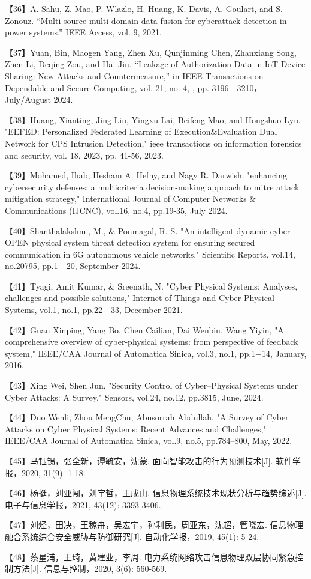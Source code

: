【36】A. Sahu, Z. Mao, P. Wlazlo, H. Huang, K. Davis, A. Goulart, and S. Zonouz. “Multi-source multi-domain data fusion for cyberattack detection in power systems.” IEEE Access, vol. 9, 2021.

【37】Yuan, Bin, Maogen Yang, Zhen Xu, Qunjinming Chen, Zhanxiang Song, Zhen Li, Deqing Zou, and Hai Jin. “Leakage of Authorization-Data in IoT Device Sharing: New Attacks and Countermeasure,” in IEEE Transactions on Dependable and Secure Computing, vol. 21, no. 4, , pp. 3196 - 3210，July/August 2024.

【38】Huang, Xianting, Jing Liu, Yingxu Lai, Beifeng Mao, and Hongshuo Lyu. "EEFED: Personalized Federated Learning of Execution\&Evaluation Dual Network for CPS Intrusion Detection," ieee transactions on information forensics and security, vol. 18, 2023, pp. 41-56, 2023.

【39】Mohamed, Ihab, Hesham A. Hefny, and Nagy R. Darwish. "enhancing cybersecurity defenses: a multicriteria decision-making approach to mitre attack mitigation strategy," International Journal of Computer Networks \& Communications (IJCNC), vol.16, no.4, pp.19-35, July 2024.

【40】Shanthalakshmi, M., \& Ponmagal, R. S. "An intelligent dynamic cyber OPEN physical system threat detection system for ensuring secured communication in 6G autonomous vehicle networks," Scientific Reports, vol.14, no.20795, pp.1 - 20, September 2024.

【41】Tyagi, Amit Kumar, \& Sreenath, N. "Cyber Physical Systems: Analyses, challenges and possible solutions," Internet of Things and Cyber-Physical Systems, vol.1, no.1, pp.22 - 33, December 2021.

【42】Guan Xinping, Yang Bo, Chen Cailian, Dai Wenbin, Wang Yiyin, "A comprehensive overview of cyber-physical systems: from perspective of feedback system," IEEE/CAA Journal of Automatica Sinica, vol.3, no.1, pp.1−14, January, 2016.

【43】Xing Wei, Shen Jun, "Security Control of Cyber–Physical Systems under Cyber Attacks: A Survey," Sensors, vol.24, no.12, pp.3815, June, 2024.

【44】Duo Wenli, Zhou MengChu, Abusorrah Abdullah, "A Survey of Cyber Attacks on Cyber Physical Systems: Recent Advances and Challenges," IEEE/CAA Journal of Automatica Sinica, vol.9, no.5, pp.784–800, May, 2022.

【45】马钰锡，张全新，谭毓安，沈蒙. 面向智能攻击的行为预测技术[J]. 软件学报，2020, 31(9): 1-18.

【46】杨挺，刘亚闯，刘宇哲，王成山. 信息物理系统技术现状分析与趋势综述[J]. 电子与信息学报，2021, 43(12): 3393-3406.

【47】刘烃，田决，王稼舟，吴宏宇，孙利民，周亚东，沈超，管晓宏. 信息物理融合系统综合安全威胁与防御研究[J]. 自动化学报，2019, 45(1): 5-24.

【48】蔡星浦，王琦，黄建业，李周. 电力系统网络攻击信息物理双层协同紧急控制方法[J]. 信息与控制，2020, 3(6): 560-569.

